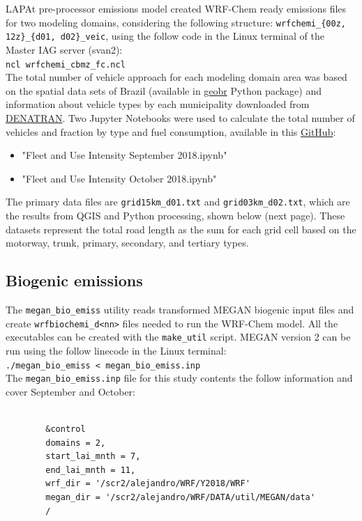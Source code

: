 {\scriptsize }
LAPAt pre-processor emissions model created WRF-Chem ready emissions files for two modeling domains, considering the following structure: \verb|wrfchemi_{00z, 12z}_{d01, d02}_veic|, using the follow code in the Linux terminal of the Master IAG server (svan2): \\
		\verb|ncl wrfchemi_cbmz_fc.ncl|\\
The total number of vehicle approach for each modeling domain area was based on the spatial data sets of Brazil (available in \href{https://github.com/ipeaGIT/geobr}{geobr} Python package) and information about vehicle types by each municipality downloaded from \href{https://www.gov.br/infraestrutura/pt-br/assuntos/transito/conteudo-denatran/frota-de-veiculos-2018}{DENATRAN}.
Two Jupyter Notebooks were used to calculate the total number of vehicles and fraction by type and fuel consumption, available in this \href{https://github.com/adelgadop/Master_Dissertation}{GitHub}:

\begin{itemize}
	\item "Fleet and Use Intensity September 2018.ipynb"
	\item "Fleet and Use Intensity October 2018.ipynb"
\end{itemize}

The primary data files are \verb|grid15km_d01.txt| and \verb|grid03km_d02.txt|, which are the results from QGIS and Python processing, shown below (next page).
These datasets represent the total road length as the sum for each grid cell based on the motorway, trunk, primary, secondary, and tertiary types.


\subsection{Biogenic emissions}\label{ap: biogenic}
The \verb|megan_bio_emiss| utility reads transformed MEGAN biogenic input files and create \verb|wrfbiochemi_d<nn>| files needed to run the WRF-Chem model.
	All the executables can be created with the \verb|make_util| script.
	MEGAN version 2 can be run using the follow linecode in the Linux terminal: \\
	\verb|./megan_bio_emiss < megan_bio_emiss.inp|\\
	The \verb|megan_bio_emiss.inp| file for this study contents the follow information and cover September and October:
	
	\begin{verbatim}
	
		&control
		domains = 2,
		start_lai_mnth = 7,
		end_lai_mnth = 11,
		wrf_dir = '/scr2/alejandro/WRF/Y2018/WRF'
		megan_dir = '/scr2/alejandro/WRF/DATA/util/MEGAN/data'
		/
	\end{verbatim}
	
